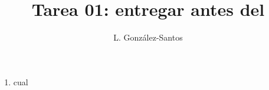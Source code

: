 \documentclass[a4paper]{article}
\title{Tarea 01: entregar antes del }
\author{L. González-Santos}
\begin{document}
\maketitle

\begin{enumerate}
\item cual
\end{enumerate}

  
\end{document}
